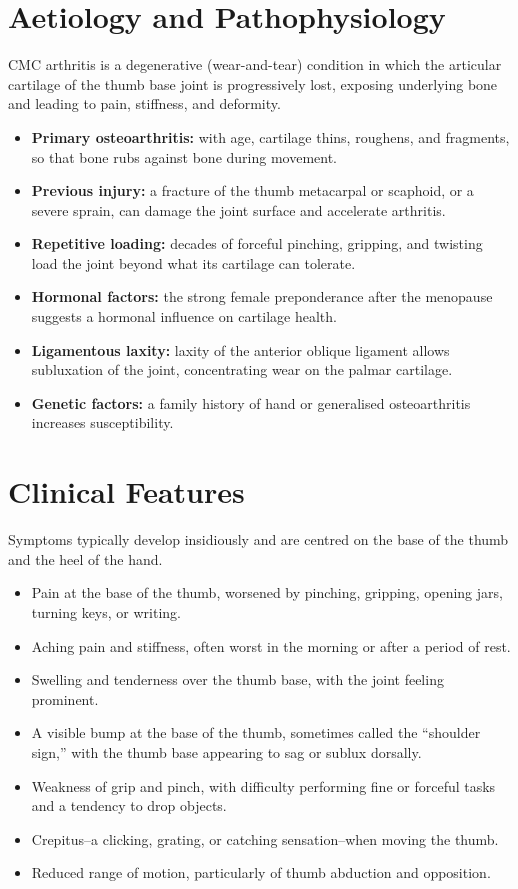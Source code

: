 \section*{Aetiology and Pathophysiology}
CMC arthritis is a degenerative (wear-and-tear) condition in which the articular cartilage of the thumb base joint is progressively lost, exposing underlying bone and leading to pain, stiffness, and deformity.
\begin{itemize}
    \item \textbf{Primary osteoarthritis:} with age, cartilage thins, roughens, and fragments, so that bone rubs against bone during movement.
    \item \textbf{Previous injury:} a fracture of the thumb metacarpal or scaphoid, or a severe sprain, can damage the joint surface and accelerate arthritis.
    \item \textbf{Repetitive loading:} decades of forceful pinching, gripping, and twisting load the joint beyond what its cartilage can tolerate.
    \item \textbf{Hormonal factors:} the strong female preponderance after the menopause suggests a hormonal influence on cartilage health.
    \item \textbf{Ligamentous laxity:} laxity of the anterior oblique ligament allows subluxation of the joint, concentrating wear on the palmar cartilage.
    \item \textbf{Genetic factors:} a family history of hand or generalised osteoarthritis increases susceptibility.
\end{itemize}

\section*{Clinical Features}
Symptoms typically develop insidiously and are centred on the base of the thumb and the heel of the hand.
\begin{itemize}
    \item Pain at the base of the thumb, worsened by pinching, gripping, opening jars, turning keys, or writing.
    \item Aching pain and stiffness, often worst in the morning or after a period of rest.
    \item Swelling and tenderness over the thumb base, with the joint feeling prominent.
    \item A visible bump at the base of the thumb, sometimes called the ``shoulder sign,'' with the thumb base appearing to sag or sublux dorsally.
    \item Weakness of grip and pinch, with difficulty performing fine or forceful tasks and a tendency to drop objects.
    \item Crepitus--a clicking, grating, or catching sensation--when moving the thumb.
    \item Reduced range of motion, particularly of thumb abduction and opposition.
\end{itemize}

